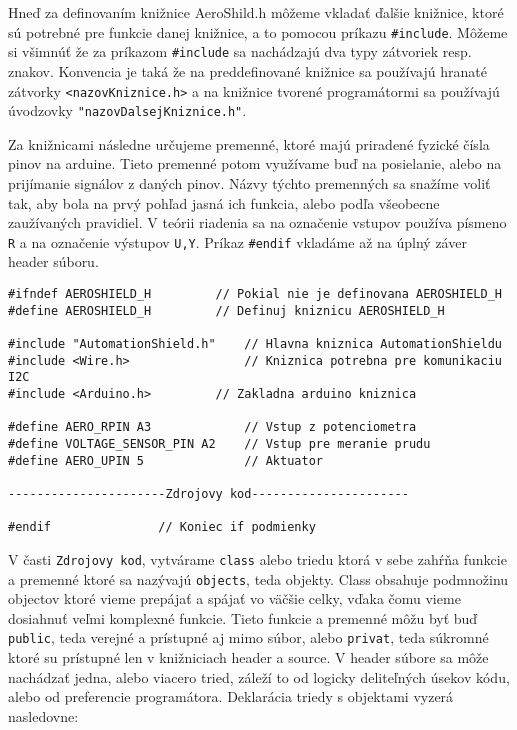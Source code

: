 Hneď za definovaním knižnice AeroShild.h môžeme vkladať ďalšie knižnice, ktoré sú potrebné pre funkcie danej knižnice, a to pomocou príkazu \verb|#include|. Môžeme si všimnúť že za príkazom \verb|#include| sa nachádzajú dva typy zátvoriek resp. znakov. Konvencia je taká že na preddefinované knižnice sa používajú hranaté zátvorky \verb|<nazovKniznice.h>| a na knižnice tvorené programátormi sa používajú úvodzovky \verb|"nazovDalsejKniznice.h"|.

Za knižnicami následne určujeme premenné, ktoré majú priradené fyzické čísla pinov na arduine. Tieto premenné potom využívame buď na posielanie, alebo na prijímanie signálov z daných pinov. Názvy týchto premenných sa snažíme voliť tak, aby bola na prvý pohľad jasná ich funkcia, alebo podľa všeobecne zaužívaných pravidiel. V teórii riadenia sa na označenie vstupov používa písmeno \verb|R| a na označenie výstupov \verb|U,Y|. Príkaz \verb|#endif| vkladáme až na úplný záver header súboru.

\begin{lstlisting}[caption={Ukážka zdrojového kódu headeru.},captionpos=b]
#ifndef AEROSHIELD_H	 	 // Pokial nie je definovana AEROSHIELD_H
#define AEROSHIELD_H	 	 // Definuj kniznicu AEROSHIELD_H

#include "AutomationShield.h"    // Hlavna kniznica AutomationShieldu
#include <Wire.h>                // Kniznica potrebna pre komunikaciu I2C
#include <Arduino.h>		 // Zakladna arduino kniznica

#define AERO_RPIN A3             // Vstup z potenciometra
#define VOLTAGE_SENSOR_PIN A2    // Vstup pre meranie prudu 
#define AERO_UPIN 5              // Aktuator

----------------------Zdrojovy kod----------------------

#endif			   	 // Koniec if podmienky 
\end{lstlisting}



V časti \verb|Zdrojovy kod|, vytvárame \verb|class| alebo triedu ktorá v sebe zahŕňa funkcie a premenné ktoré sa nazývajú \verb|objects|, teda objekty. Class obsahuje podmnožinu objectov ktoré vieme prepájať a spájať vo väčšie celky, vďaka čomu vieme dosiahnuť veľmi komplexné funkcie. Tieto funkcie a premenné môžu byť buď \verb|public|, teda verejné a prístupné aj mimo súbor, alebo \verb|privat|, teda súkromné ktoré su prístupné len v knižniciach header a source. V header súbore sa môže nachádzať jedna, alebo viacero tried, záleží to od logicky deliteľných úsekov kódu, alebo od preferencie programátora. Deklarácia triedy s objektami vyzerá nasledovne: 

